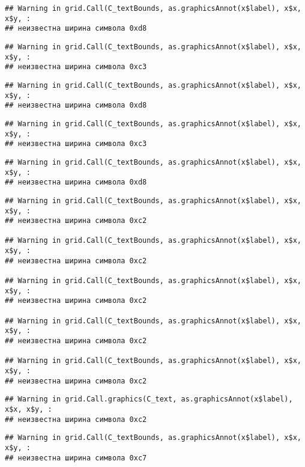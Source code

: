\documentclass[
]{article}
\begin{document}
\begin{verbatim}
## Warning in grid.Call(C_textBounds, as.graphicsAnnot(x$label), x$x, x$y, :
## неизвестна ширина символа 0xd8
\end{verbatim}

\begin{verbatim}
## Warning in grid.Call(C_textBounds, as.graphicsAnnot(x$label), x$x, x$y, :
## неизвестна ширина символа 0xc3
\end{verbatim}

\begin{verbatim}
## Warning in grid.Call(C_textBounds, as.graphicsAnnot(x$label), x$x, x$y, :
## неизвестна ширина символа 0xd8
\end{verbatim}

\begin{verbatim}
## Warning in grid.Call(C_textBounds, as.graphicsAnnot(x$label), x$x, x$y, :
## неизвестна ширина символа 0xc3
\end{verbatim}

\begin{verbatim}
## Warning in grid.Call(C_textBounds, as.graphicsAnnot(x$label), x$x, x$y, :
## неизвестна ширина символа 0xd8
\end{verbatim}

\begin{verbatim}
## Warning in grid.Call(C_textBounds, as.graphicsAnnot(x$label), x$x, x$y, :
## неизвестна ширина символа 0xc2

## Warning in grid.Call(C_textBounds, as.graphicsAnnot(x$label), x$x, x$y, :
## неизвестна ширина символа 0xc2

## Warning in grid.Call(C_textBounds, as.graphicsAnnot(x$label), x$x, x$y, :
## неизвестна ширина символа 0xc2

## Warning in grid.Call(C_textBounds, as.graphicsAnnot(x$label), x$x, x$y, :
## неизвестна ширина символа 0xc2

## Warning in grid.Call(C_textBounds, as.graphicsAnnot(x$label), x$x, x$y, :
## неизвестна ширина символа 0xc2
\end{verbatim}

\begin{verbatim}
## Warning in grid.Call.graphics(C_text, as.graphicsAnnot(x$label), x$x, x$y, :
## неизвестна ширина символа 0xc2
\end{verbatim}

\begin{verbatim}
## Warning in grid.Call(C_textBounds, as.graphicsAnnot(x$label), x$x, x$y, :
## неизвестна ширина символа 0xc7
\end{verbatim}
\end{document}
